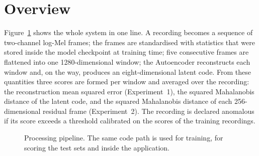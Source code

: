 \section{Overview}
Figure~\ref{fig:pipeline} shows the whole system in one line. A recording becomes a sequence of two-channel log-Mel frames; the frames are standardised with statistics that were stored inside the model checkpoint at training time; five consecutive frames are flattened into one 1280-dimensional window; the Autoencoder reconstructs each window and, on the way, produces an eight-dimensional latent code. From these quantities three scores are formed per window and averaged over the recording: the reconstruction mean squared error (Experiment~1), the squared Mahalanobis distance of the latent code, and the squared Mahalanobis distance of each 256-dimensional residual frame (Experiment~2). The recording is declared anomalous if its score exceeds a threshold calibrated on the scores of the training recordings.

\begin{figure}[!htb]\centering
{}
\caption{Processing pipeline. The same code path is used for training, for scoring the test sets and inside the application.}
\label{fig:pipeline}
\end{figure}

